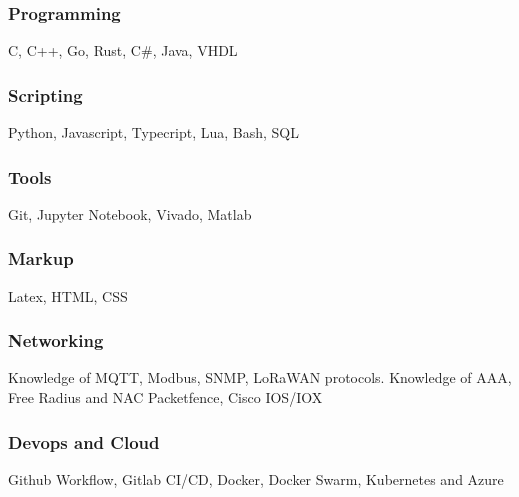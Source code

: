 \documentclass[11pt,a4paper]{article}
\begin{document}
  \subsubsection{Programming}
  C, C++, Go, Rust, C\#, Java, VHDL

  \subsubsection{Scripting}
  Python, Javascript, Typecript, Lua, Bash, SQL

  \subsubsection{Tools}
  Git, Jupyter Notebook, Vivado, Matlab

  \subsubsection{Markup}
  Latex, HTML, CSS

  \subsubsection{Networking}
  Knowledge of MQTT, Modbus, SNMP, LoRaWAN protocols. Knowledge of AAA, Free Radius and NAC Packetfence, Cisco IOS/IOX

  \subsubsection{Devops and Cloud}
  Github Workflow, Gitlab CI/CD, Docker, Docker Swarm, Kubernetes and Azure

\end{document}
